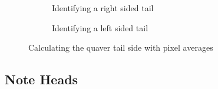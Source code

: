 \begin{figure}[h!]
    \centering

    \begin{subfigure}[b]{.45\linewidth}
        \centering
      \caption{Identifying a right sided tail}
      \label{fig:quaver-tail-average-position-right}
    \end{subfigure}
    \begin{subfigure}[b]{.45\linewidth}
        \centering
      \caption{Identifying a left sided tail}
      \label{fig:quaver-tail-average-position-left}
    \end{subfigure}

      \caption{Calculating the quaver tail side with pixel averages}
      \label{fig:quaver-tail-average-position}
\end{figure}

\subsection{Note Heads}

